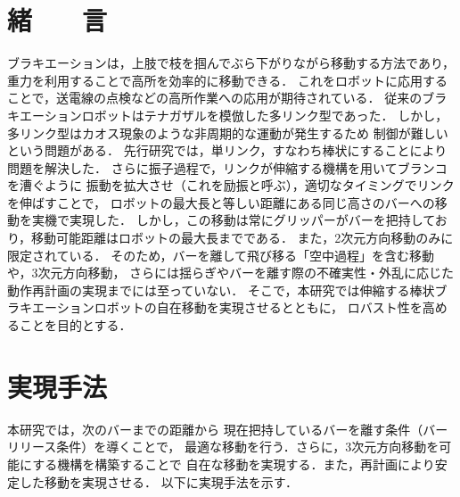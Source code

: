 \begin{small}
\vspace{-2mm}
\section{緒　　言}
\vspace{-2.5mm}
ブラキエーションは，上肢で枝を掴んでぶら下がりながら移動する方法であり，
重力を利用することで高所を効率的に移動できる．
これをロボットに応用することで\cite{福田敏男1990ブラキエーション形移動ロボットの研究}，送電線の点検などの高所作業への応用が期待されている．
従来のブラキエーションロボットはテナガザルを模倣した多リンク型であった．
しかし，多リンク型はカオス現象のような非周期的な運動が発生するため
制御が難しいという問題がある\cite{鈴木三男2000二重振り子におけるカオス的振舞}．
先行研究では，単リンク，すなわち棒状にすることにより問題を解決した．
さらに振子過程で，リンクが伸縮する機構を用いてブランコを漕ぐように
振動を拡大させ（これを励振と呼ぶ），適切なタイミングでリンクを伸ばすことで，
ロボットの最大長と等しい距離にある同じ高さのバーへの移動を実機で実現した\cite{Hijiri:Robomech2024}．
しかし，この移動は常にグリッパーがバーを把持しており，移動可能距離はロボットの最大長までである．
また，2次元方向移動のみに限定されている．
そのため，バーを離して飛び移る「空中過程」を含む移動や，3次元方向移動，
さらには揺らぎやバーを離す際の不確実性・外乱に応じた動作再計画の実現までには至っていない．
そこで，本研究では伸縮する棒状ブラキエーションロボットの自在移動を実現させるとともに，
ロバスト性を高めることを目的とする．
\vspace{-2.65mm}
\section{実現手法}
\vspace{-2.5mm}
本研究では，次のバーまでの距離から
現在把持しているバーを離す条件（バーリリース条件）を導くことで，
最適な移動を行う．さらに，3次元方向移動を可能にする機構を構築することで
自在な移動を実現する．また，再計画により安定した移動を実現させる．
以下に実現手法を示す．
\vspace{-1mm}

\end{small}
